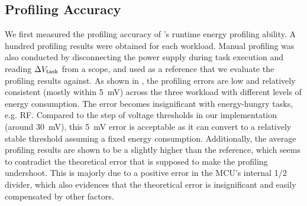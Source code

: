 

\subsection{Profiling Accuracy}




We first measured the profiling accuracy of \nn{}'s runtime energy profiling ability. 
A hundred profiling results were obtained for each workload. 
Manual profiling was also conducted by disconnecting the power supply during task execution and reading $\Delta V_{\text{task}}$ from a scope, and used as a reference that we evaluate the profiling results against. 
As shown in , the profiling errors are low and relatively consistent (mostly within \SI{5}{\milli\volt}) across the three workload with different levels of energy consumption. 
The error becomes insignificant with energy-hungry tasks, e.g. RF. 
Compared to the step of voltage thresholds in our implementation (around \SI{30}{\milli\volt}), this \SI{5}{\milli\volt} error is acceptable as it can convert to a relatively stable threshold assuming a fixed energy consumption. 
Additionally, the average profiling results are shown to be a slightly higher than the reference, which 
seems to contradict the theoretical error that is supposed to make the profiling undershoot.
This is majorly due to a positive error in the MCU's internal 1/2  divider, which also evidences that the theoretical error is insignificant and easily compensated by other factors. 

